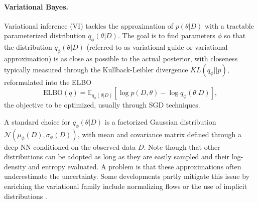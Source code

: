\paragraph{Variational Bayes.} 

Variational inference (VI) \parencite{blei2017variational} tackles the 
 approximation of  $p(\theta | D)$ with a tractable parameterized
 distribution $q_{\phi}(\theta |D)$. The goal is to find parameters $\phi$ so that the distribution 
$q_{\phi}(\theta |D )$  (referred to as variational guide
or variational approximation)  is as close as possible to the actual posterior, with closeness typically measured through 
the Kullback-Leibler 
divergence $KL(q_{\phi } || p)$, reformulated into the ELBO
\begin{equation}\label{eq:elbo}
\mbox{ELBO}(q) = \mathbb{E}_{q_{\phi}(\theta |D)} \left[ \log p(D,\theta ) - \log q_{\phi}(\theta |D)\right],
\end{equation}
the objective to be optimized,
usually through SGD techniques. 

A standard choice
for $q_{\phi}(\theta |D )$ is a factorized Gaussian 
distribution $\mathcal{N}(\mu_{\phi}(D), \sigma_{\phi}(D))$,
with  mean and covariance matrix defined through a
 deep NN conditioned on the observed data $D$.
 Note though that 
other distributions can be adopted as long as they 
 are easily sampled and their log-density and entropy evaluated. 
A problem is that these approximations often 
underestimate the uncertainty. Some developments
partly mitigate this  issue
by  enriching the variational family include normalizing flows \parencite{rezende2015variational} or the use of implicit distributions \parencite{huszar2017variational}.

